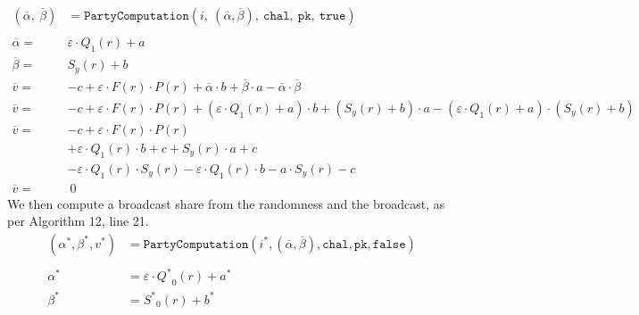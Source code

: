 \documentclass[11pt]{report}
\theoremstyle{definition}
\theoremstyle{plain}
\begin{document}
\begin{align*}
  (\overline{\alpha},\ \overline{\beta})         & =
  \texttt{PartyComputation}(i,\ (\overline{\alpha}, \overline{\beta}),\ \texttt{chal},\ \texttt{pk},\ \texttt{true})                                                                                            \\\\
  \overline{\alpha}                         =    & \varepsilon \cdot Q_1(r) + a                                                                                                                                 \\
  \overline{\beta}                          =    & S_y(r)  + b                                                                                                                                                  \\
  \overline{v}                            =      & -c + \varepsilon \cdot F(r) \cdot P(r) + \overline{\alpha} \cdot b + \overline{\beta} \cdot a  - \overline{\alpha} \cdot \overline{\beta}                    \\
  \overline{v}                            =      & -c + \varepsilon \cdot F(r) \cdot P(r) + (\varepsilon \cdot Q_1(r) + a) \cdot b + (S_y(r)  + b) \cdot a  - (\varepsilon \cdot Q_1(r) + a) \cdot (S_y(r) + b) \\
  \overline{v}                            =      & -c + \varepsilon \cdot F(r) \cdot P(r)                                                                                                                       \\
                                                 & + \varepsilon \cdot Q_1(r) \cdot b + c + S_y(r) \cdot a + c                                                                                                  \\
                                                 & - \varepsilon \cdot Q_1(r) \cdot S_y(r) - \varepsilon \cdot Q_1(r) \cdot b - a \cdot S_y(r) - c                                                              \\
  \overline{v}                                 = & \ 0
\end{align*}
We then compute a broadcast share from the randomness and the broadcast, as per Algorithm 12, line 21.
\begin{align*}
  (\alpha^*, \beta^*, v^*) & = \texttt{PartyComputation}(i^*, (\overline{\alpha},
  \overline{\beta}), \texttt{chal}, \texttt{pk}, \texttt{false})                  \\\\
  \alpha^*                 & = \varepsilon \cdot {Q^*}_0(r) + a^*                 \\
  \beta^*                  & =  {S^*}_0(r) + b^*
\end{align*}
\end{document}

